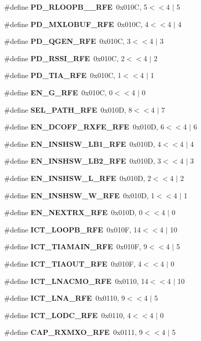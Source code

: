 \begin{DoxyCompactItemize}
\#define {\bf P\+D\+\_\+\+R\+L\+O\+O\+P\+B\+\_\+\_\+\+R\+FE}~0x010\+C, 5$<$$<$4 $\vert$  5
\item 
\#define {\bf P\+D\+\_\+\+M\+X\+L\+O\+B\+U\+F\+\_\+\+R\+FE}~0x010\+C, 4$<$$<$4 $\vert$  4
\item 
\#define {\bf P\+D\+\_\+\+Q\+G\+E\+N\+\_\+\+R\+FE}~0x010\+C, 3$<$$<$4 $\vert$  3
\item 
\#define {\bf P\+D\+\_\+\+R\+S\+S\+I\+\_\+\+R\+FE}~0x010\+C, 2$<$$<$4 $\vert$  2
\item 
\#define {\bf P\+D\+\_\+\+T\+I\+A\+\_\+\+R\+FE}~0x010\+C, 1$<$$<$4 $\vert$  1
\item 
\#define {\bf E\+N\+\_\+\+G\+\_\+\+R\+FE}~0x010\+C, 0$<$$<$4 $\vert$  0
\item 
\#define {\bf S\+E\+L\+\_\+\+P\+A\+T\+H\+\_\+\+R\+FE}~0x010\+D, 8$<$$<$4 $\vert$  7
\item 
\#define {\bf E\+N\+\_\+\+D\+C\+O\+F\+F\+\_\+\+R\+X\+F\+E\+\_\+\+R\+FE}~0x010\+D, 6$<$$<$4 $\vert$  6
\item 
\#define {\bf E\+N\+\_\+\+I\+N\+S\+H\+S\+W\+\_\+\+L\+B1\+\_\+\+R\+FE}~0x010\+D, 4$<$$<$4 $\vert$  4
\item 
\#define {\bf E\+N\+\_\+\+I\+N\+S\+H\+S\+W\+\_\+\+L\+B2\+\_\+\+R\+FE}~0x010\+D, 3$<$$<$4 $\vert$  3
\item 
\#define {\bf E\+N\+\_\+\+I\+N\+S\+H\+S\+W\+\_\+\+L\+\_\+\+R\+FE}~0x010\+D, 2$<$$<$4 $\vert$  2
\item 
\#define {\bf E\+N\+\_\+\+I\+N\+S\+H\+S\+W\+\_\+\+W\+\_\+\+R\+FE}~0x010\+D, 1$<$$<$4 $\vert$  1
\item 
\#define {\bf E\+N\+\_\+\+N\+E\+X\+T\+R\+X\+\_\+\+R\+FE}~0x010\+D, 0$<$$<$4 $\vert$  0
\item 
\#define {\bf I\+C\+T\+\_\+\+L\+O\+O\+P\+B\+\_\+\+R\+FE}~0x010\+F, 14$<$$<$4 $\vert$  10
\item 
\#define {\bf I\+C\+T\+\_\+\+T\+I\+A\+M\+A\+I\+N\+\_\+\+R\+FE}~0x010\+F, 9$<$$<$4 $\vert$  5
\item 
\#define {\bf I\+C\+T\+\_\+\+T\+I\+A\+O\+U\+T\+\_\+\+R\+FE}~0x010\+F, 4$<$$<$4 $\vert$  0
\item 
\#define {\bf I\+C\+T\+\_\+\+L\+N\+A\+C\+M\+O\+\_\+\+R\+FE}~0x0110, 14$<$$<$4 $\vert$  10
\item 
\#define {\bf I\+C\+T\+\_\+\+L\+N\+A\+\_\+\+R\+FE}~0x0110, 9$<$$<$4 $\vert$  5
\item 
\#define {\bf I\+C\+T\+\_\+\+L\+O\+D\+C\+\_\+\+R\+FE}~0x0110, 4$<$$<$4 $\vert$  0
\item 
\#define {\bf C\+A\+P\+\_\+\+R\+X\+M\+X\+O\+\_\+\+R\+FE}~0x0111, 9$<$$<$4 $\vert$  5

\end{DoxyCompactItemize}
